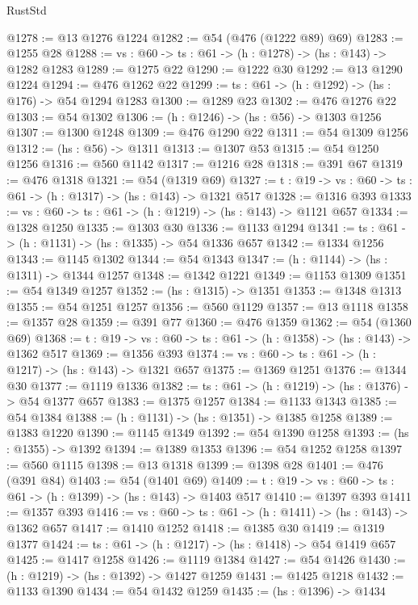 \begin{lexlean}{RustStd}
\begin{coremodule}
@1278 := @13 @1276 @1224
@1282 := @54 (@476 (@1222 @89) @69)
@1283 := @1255 @28
@1288 := {vs : @60} -> {ts : @61} -> (h : @1278) -> (hs : @143) -> @1282 @1283
@1289 := @1275 @22
@1290 := @1222 @30
@1292 := @13 @1290 @1224
@1294 := @476 @1262 @22
@1299 := {ts : @61} -> (h : @1292) -> (hs : @176) -> @54 @1294 @1283
@1300 := @1289 @23
@1302 := @476 @1276 @22
@1303 := @54 @1302
@1306 := (h : @1246) -> (hs : @56) -> @1303 @1256
@1307 := @1300 @1248
@1309 := @476 @1290 @22
@1311 := @54 @1309 @1256
@1312 := (hs : @56) -> @1311
@1313 := @1307 @53
@1315 := @54 @1250 @1256
@1316 := @560 @1142
@1317 := @1216 @28
@1318 := @391 @67
@1319 := @476 @1318
@1321 := @54 (@1319 @69)
@1327 := {t : @19} -> {vs : @60} -> {ts : @61} -> (h : @1317) -> (hs : @143) -> @1321 @517
@1328 := @1316 @393
@1333 := {vs : @60} -> {ts : @61} -> (h : @1219) -> (hs : @143) -> @1121 @657
@1334 := @1328 @1250
@1335 := @1303 @30
@1336 := @1133 @1294
@1341 := {ts : @61} -> (h : @1131) -> (hs : @1335) -> @54 @1336 @657
@1342 := @1334 @1256
@1343 := @1145 @1302
@1344 := @54 @1343
@1347 := (h : @1144) -> (hs : @1311) -> @1344 @1257
@1348 := @1342 @1221
@1349 := @1153 @1309
@1351 := @54 @1349 @1257
@1352 := (hs : @1315) -> @1351
@1353 := @1348 @1313
@1355 := @54 @1251 @1257
@1356 := @560 @1129
@1357 := @13 @1118
@1358 := @1357 @28
@1359 := @391 @77
@1360 := @476 @1359
@1362 := @54 (@1360 @69)
@1368 := {t : @19} -> {vs : @60} -> {ts : @61} -> (h : @1358) -> (hs : @143) -> @1362 @517
@1369 := @1356 @393
@1374 := {vs : @60} -> {ts : @61} -> (h : @1217) -> (hs : @143) -> @1321 @657
@1375 := @1369 @1251
@1376 := @1344 @30
@1377 := @1119 @1336
@1382 := {ts : @61} -> (h : @1219) -> (hs : @1376) -> @54 @1377 @657
@1383 := @1375 @1257
@1384 := @1133 @1343
@1385 := @54 @1384
@1388 := (h : @1131) -> (hs : @1351) -> @1385 @1258
@1389 := @1383 @1220
@1390 := @1145 @1349
@1392 := @54 @1390 @1258
@1393 := (hs : @1355) -> @1392
@1394 := @1389 @1353
@1396 := @54 @1252 @1258
@1397 := @560 @1115
@1398 := @13 @1318
@1399 := @1398 @28
@1401 := @476 (@391 @84)
@1403 := @54 (@1401 @69)
@1409 := {t : @19} -> {vs : @60} -> {ts : @61} -> (h : @1399) -> (hs : @143) -> @1403 @517
@1410 := @1397 @393
@1411 := @1357 @393
@1416 := {vs : @60} -> {ts : @61} -> (h : @1411) -> (hs : @143) -> @1362 @657
@1417 := @1410 @1252
@1418 := @1385 @30
@1419 := @1319 @1377
@1424 := {ts : @61} -> (h : @1217) -> (hs : @1418) -> @54 @1419 @657
@1425 := @1417 @1258
@1426 := @1119 @1384
@1427 := @54 @1426
@1430 := (h : @1219) -> (hs : @1392) -> @1427 @1259
@1431 := @1425 @1218
@1432 := @1133 @1390
@1434 := @54 @1432 @1259
@1435 := (hs : @1396) -> @1434

\end{coremodule}
\end{lexlean}
